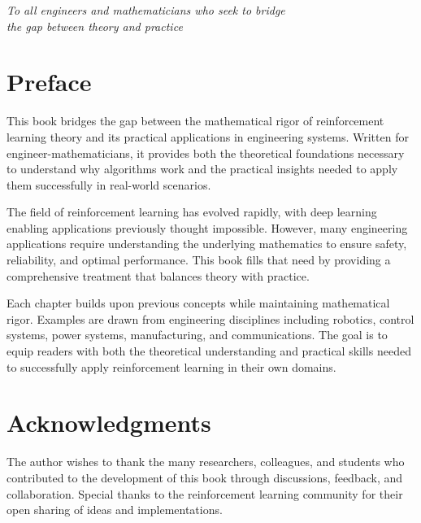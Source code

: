 \documentclass[11pt,twoside,openright]{book}
\theoremstyle{definition}
\begin{document}
\newpage
\thispagestyle{empty}
\vspace*{\fill}
\begin{center}
\textit{To all engineers and mathematicians who seek to bridge\\
the gap between theory and practice}
\end{center}
\vspace*{\fill}

\chapter*{Preface}

This book bridges the gap between the mathematical rigor of reinforcement learning theory and its practical applications in engineering systems. Written for engineer-mathematicians, it provides both the theoretical foundations necessary to understand why algorithms work and the practical insights needed to apply them successfully in real-world scenarios.

The field of reinforcement learning has evolved rapidly, with deep learning enabling applications previously thought impossible. However, many engineering applications require understanding the underlying mathematics to ensure safety, reliability, and optimal performance. This book fills that need by providing a comprehensive treatment that balances theory with practice.

Each chapter builds upon previous concepts while maintaining mathematical rigor. Examples are drawn from engineering disciplines including robotics, control systems, power systems, manufacturing, and communications. The goal is to equip readers with both the theoretical understanding and practical skills needed to successfully apply reinforcement learning in their own domains.

\chapter*{Acknowledgments}

The author wishes to thank the many researchers, colleagues, and students who contributed to the development of this book through discussions, feedback, and collaboration. Special thanks to the reinforcement learning community for their open sharing of ideas and implementations.

\tableofcontents
\end{document}
